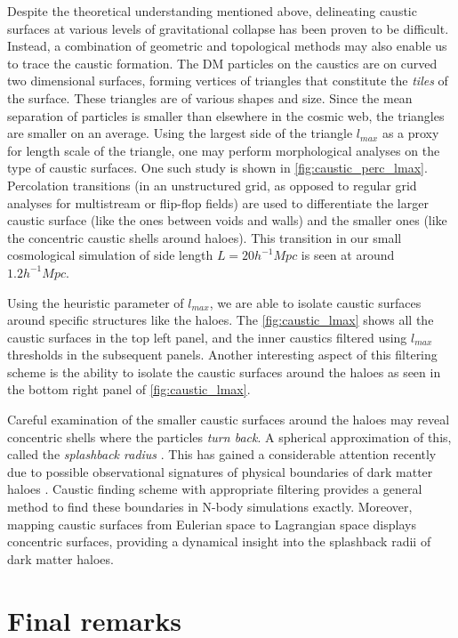 Despite the theoretical understanding mentioned above, delineating caustic surfaces at various levels of gravitational collapse has been proven to be difficult. Instead, a combination of geometric and topological methods may also enable us to trace the caustic formation. The DM particles on the caustics are on curved two dimensional surfaces, forming vertices of triangles that constitute the {\it tiles} of the surface. These triangles are of various shapes and size. Since the mean separation of particles is smaller than elsewhere in the cosmic web, the triangles are smaller on an average. Using the largest side of the triangle $l_{max}$ as a proxy for length scale of the triangle, one may perform morphological analyses on the type of caustic surfaces. One such study is shown in \autoref{fig:caustic_perc_lmax}. Percolation transitions (in an unstructured grid, as opposed to regular grid analyses for multistream or flip-flop fields) are used to differentiate the larger caustic surface (like the ones between voids and walls) and the smaller ones (like the concentric caustic shells around haloes). This transition in our small cosmological simulation of side length $L = 20 h^{-1} Mpc$ is seen at around $1.2 h^{-1} Mpc$. 


Using the heuristic parameter of $l_{max}$, we are able to isolate caustic surfaces around specific structures like the haloes. The \autoref{fig:caustic_lmax} shows all the caustic surfaces in the top left panel, and the inner caustics filtered using $l_{max}$ thresholds in the subsequent panels. Another interesting aspect of this filtering scheme is the ability to isolate the caustic surfaces around the haloes as seen in the bottom right panel of \autoref{fig:caustic_lmax}. 


Careful examination of the smaller caustic surfaces around the haloes may reveal concentric shells where the particles {\it turn back}. A spherical approximation of this, called the {\it splashback radius} \citep{More2015}. This has gained a considerable attention recently due to possible observational signatures of physical boundaries of dark matter haloes \citep{Chang2017}. Caustic finding scheme with appropriate filtering provides a general method to find these boundaries in N-body simulations exactly. Moreover, mapping caustic surfaces from Eulerian space to Lagrangian space displays concentric surfaces, providing a dynamical insight into the splashback radii of dark matter haloes. 



\section{Final remarks}

